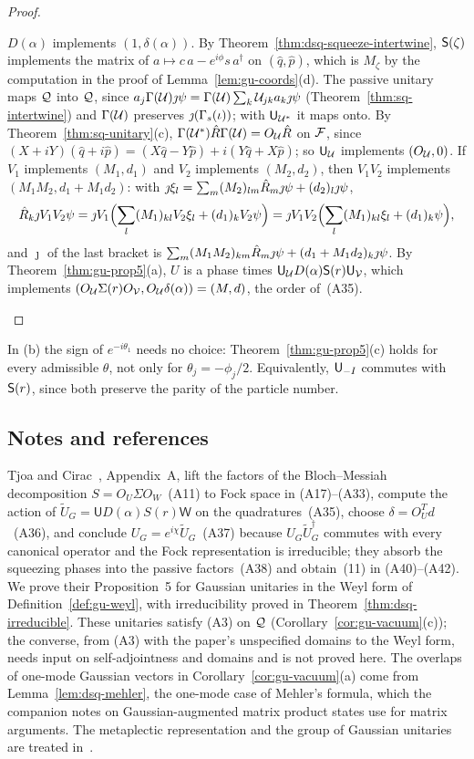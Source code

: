 \begin{veteenv}
\begin{proof}
\begin{enumerate}
$D(\alpha)$ implements $(1,\delta(\alpha))$. By Theorem~\ref{thm:dsq-squeeze-intertwine}, $\mathsf S(\zeta)$ implements the matrix of
$a\mapsto c\,a-e^{i\phi}s\,a^\dagger$ on $(\hat q,\hat p)$, which is $M_\zeta$ by the computation in the proof of Lemma~\ref{lem:gu-coords}(d).
The passive unitary maps $\mathcal Q$ into $\mathcal Q$, since $a_j\Gamma(\mathcal U)\jmath\psi=\Gamma(\mathcal U)\sum_k\mathcal U_{jk}a_k\jmath\psi$
(Theorem~\ref{thm:sq-intertwine}) and $\Gamma(\mathcal U)$ preserves $\jmath(\Gamma_s(\iota))$; with $\mathsf U_{\mathcal U^*}$ it maps onto. By
Theorem~\ref{thm:sq-unitary}(c), $\Gamma(\mathcal U^*)\hat R\Gamma(\mathcal U)=O_\mathcal U\hat R$ on $\mathcal F$, since $(X+iY)(\hat q+i\hat p)=(X\hat q-Y\hat p)+i(Y\hat q+X\hat p)$;
so $\mathsf U_\mathcal U$ implements $(O_\mathcal U,0)$. If $V_1$ implements $(M_1,d_1)$ and $V_2$ implements $(M_2,d_2)$, then $V_1V_2$ implements
$(M_1M_2,d_1+M_1d_2)$: with $\jmath\xi_l=\sum_m(M_2)_{lm}\hat R_m\jmath\psi+(d_2)_l\jmath\psi$,
\[
 \hat R_k\jmath V_1V_2\psi=\jmath V_1\Bigl(\sum_l(M_1)_{kl}V_2\xi_l+(d_1)_kV_2\psi\Bigr)=\jmath V_1V_2\Bigl(\sum_l(M_1)_{kl}\xi_l+(d_1)_k\psi\Bigr),
\]
and $\jmath$ of the last bracket is $\sum_m(M_1M_2)_{km}\hat R_m\jmath\psi+(d_1+M_1d_2)_k\jmath\psi$. By Theorem~\ref{thm:gu-prop5}(a), $U$ is a phase
times $\mathsf U_\mathcal U D(\alpha)\mathsf S(r)\mathsf U_\mathcal V$, which implements $(O_\mathcal U\Sigma(r)O_\mathcal V,O_\mathcal U\delta(\alpha))=(M,d)$, the order of~(A35).\qedhere
\end{enumerate}
\end{proof}

In (b) the sign of $e^{-i\theta_1}$ needs no choice: Theorem~\ref{thm:gu-prop5}(c) holds for every admissible $\theta$, not only for
$\theta_j=-\phi_j/2$. Equivalently, $\mathsf U_{-I}$ commutes with $\mathsf S(r)$, since both preserve the parity of the particle number.

\subsection*{Notes and references}

Tjoa and Cirac~\cite{tjoacirac}, Appendix~A, lift the factors of the Bloch--Messiah decomposition $S=O_U\Sigma O_W$~(A11) to Fock space
in (A17)--(A33), compute the action of $\tilde U_G=\mathsf UD(\alpha)S(r)\mathsf W$ on the quadratures~(A35), choose $\delta=O_U^Td$~(A36),
and conclude $U_G=e^{i\chi}\tilde U_G$~(A37) because $U_G\tilde U_G^\dagger$ commutes with every canonical operator and the Fock
representation is irreducible; they absorb the squeezing phases into the passive factors~(A38) and obtain~(11) in (A40)--(A42).
We prove their Proposition~5 for Gaussian unitaries in the Weyl form of Definition~\ref{def:gu-weyl}, with irreducibility proved in
Theorem~\ref{thm:dsq-irreducible}. These unitaries satisfy (A3) on $\mathcal Q$ (Corollary~\ref{cor:gu-vacuum}(c)); the converse, from
(A3) with the paper's unspecified domains to the Weyl form, needs input on self-adjointness and domains and is not proved here.
The overlaps of one-mode Gaussian vectors in Corollary~\ref{cor:gu-vacuum}(a) come from Lemma~\ref{lem:dsq-mehler}, the
one-mode case of Mehler's formula, which the companion notes on Gaussian-augmented matrix product states use for matrix
arguments. The metaplectic representation and the group of Gaussian unitaries are treated in~\cite{folland}.
\end{veteenv}
